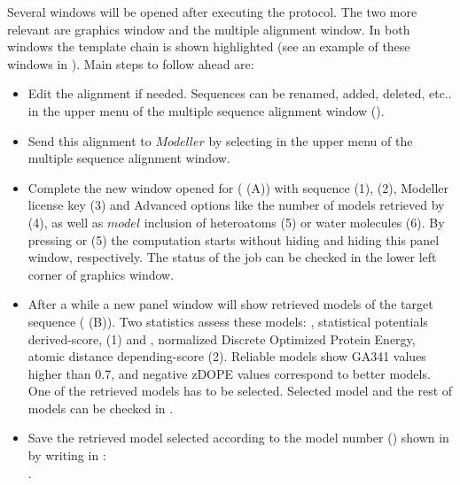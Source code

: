 \begin{itemize}
  Several \chimera windows will be opened after executing the protocol. The two more relevant are \chimera graphics window and the multiple alignment window. In both windows the template chain is shown highlighted (see an example of these windows in ). Main steps to follow ahead are:\\
  \begin{itemize}
   \item Edit the alignment if needed. Sequences can be renamed, added, deleted, etc.. in the upper menu of the multiple sequence alignment window ().\\
   \item Send this alignment to $Modeller$ by selecting  in the upper menu of the multiple sequence alignment window.\\ 
   \item Complete the new window opened for  ( (A)) with  sequence (1),  (2), Modeller license key (3) and Advanced options like the number of models retrieved by \modeller (4), as well as $model$ inclusion of heteroatoms (5) or water molecules (6). By pressing  or  (5) the computation starts without hiding and hiding this panel window, respectively. The status of the job can be checked in the lower left corner of \chimera graphics window.\\
   \item After a while a new panel window will show retrieved models of the target sequence ( (B)). Two statistics assess these models: , statistical potentials derived-score, (1) and , normalized Discrete Optimized Protein Energy, atomic distance depending-score (2). Reliable models show GA341 values higher than 0.7, and negative zDOPE values correspond to better models. One of the retrieved models has to be selected. Selected model and the rest of models can be checked in \chimera {}.\\
   \item Save the retrieved model selected according to the model number () shown in \chimera {} by writing in \chimera {}:\\.\\
  \end{itemize}
  

\end{itemize}
